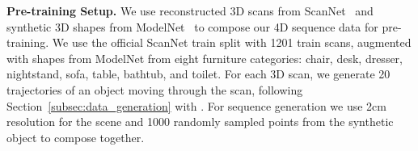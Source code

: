 \documentclass[runningheads]{llncs}
\newcommand{\OURS}{4DContrast}
\begin{document}
\begin{table}[b]
  \centering
  \vspace{-0.3cm}
  \caption{3D object detection on ScanNet.
  Our \OURS{} pre-training leads to improved performance in comparison with state of the art object detection and 3D pretraining schemes.
  }
  \vspace{-0.1cm}
  \vspace{-0.1in}
  \label{tab:det_scannet}
\end{table}

\noindent \textbf{Pre-training Setup.}
We use reconstructed 3D scans from ScanNet~\cite{dai2017scannet} and synthetic 3D shapes from ModelNet~\cite{wu20153d} to compose our 4D sequence data for pre-training.
We use the official ScanNet train split with 1201 train scans, augmented with shapes from ModelNet from eight furniture categories: chair, desk, dresser, nightstand, sofa, table, bathtub, and toilet. 
For each 3D scan, we generate 20 trajectories of an object moving through the scan, following Section~\ref{subsec:data_generation} with .
For sequence generation we use 2cm resolution for the scene and 1000 randomly sampled points from the synthetic object to compose together.
\end{document}
